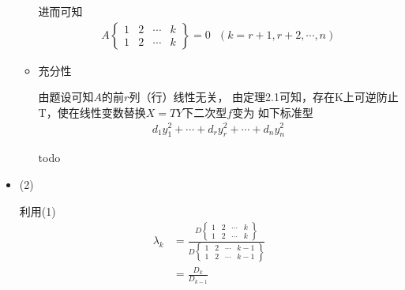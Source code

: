 \documentclass{article}
\begin{document}
\begin{itemize}
\begin{itemize}
                进而可知
                \begin{align*}
                  A \begin{Bmatrix}
                      1 & 2 & \cdots & k \\
                      1 & 2 & \cdots & k
                    \end{Bmatrix}
                  = 0 \ \ \ (k = r + 1, r + 2, \cdots, n)
                \end{align*}

          \item 充分性

                由题设可知$A$的前$r$列（行）线性无关，
                由定理2.1可知，存在K上可逆防止T，使在线性变数替换$X = TY$下二次型$f$变为
                如下标准型
                \begin{align*}
                  d_1 y_1^2 + \cdots + d_r y_r^2 + \cdots + d_n y_n^2
                \end{align*}

                todo 


        \end{itemize}
  \item (2)

        利用(1)
        \begin{align*}
          \lambda_k & = \frac{D \begin{Bmatrix}
                                    1 & 2 & \cdots & k \\
                                    1 & 2 & \cdots & k
                                  \end{Bmatrix}}{D \begin{Bmatrix}
                                                     1 & 2 & \cdots & k-1 \\
                                                     1 & 2 & \cdots & k-1
                                                   \end{Bmatrix}} \\
                    & =\frac{D_k}{D_{k-1}}
        \end{align*}
\end{itemize}
\end{document}
